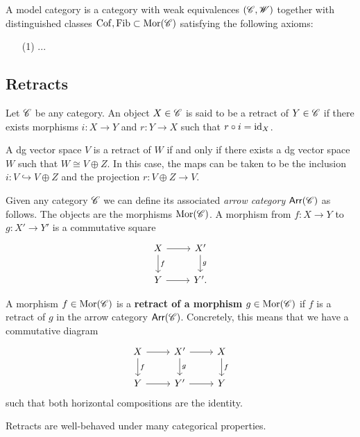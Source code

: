 \documentclass[11pt]{amsart}
\begin{document}
\begin{dfn}
A model category is a category with weak equivalences $(\mathscr C, \mathscr W)$ together with distinguished classes ${\rm Cof}, {\rm Fib} \subset {\rm Mor}(\mathscr C)$ satisfying the following axioms:
\begin{enumerate}
\item[(1)] ...
\end{enumerate}
\end{dfn}

\subsection{Retracts}

Let $\mathscr C$ be any category.
An object $X \in \mathscr C$ is said to be a retract of $Y \in \mathscr C$ if there exists morphisms $i : X \to Y$ and $r : Y \to X$ such that $r \circ i = {\rm id}_X$. 

\begin{eg}
A dg vector space $V$ is a retract of $W$ if and only if there exists a dg vector space $W$ such that $W \cong V \oplus Z$.
In this case, the maps can be taken to be the inclusion $i : V \hookrightarrow V \oplus Z$ and the projection $r : V \oplus Z \to V$. 
\end{eg}

\def\Arr{{\sf Arr}}

Given any category $\mathscr C$ we can define its associated {\em arrow category} $\Arr(\sC)$ as follows. 
The objects are the morphisms ${\rm Mor}(\mathscr C)$. 
A morphism from $f : X \to Y$ to $g : X' \to Y'$ is a commutative square
\[
\begin{tikzcd}
X \ar[r] \ar[d,"f"] & X' \ar[d, "g"] \\
Y \ar[r] & Y' .
\end{tikzcd}
\]

\begin{dfn}
A morphism $f \in {\rm Mor}(\mathscr C)$ is a {\bf retract of a morphism} $g \in {\rm Mor}(\mathscr C)$ if $f$ is a retract of $g$ in the arrow category $\Arr(\sC)$. 
Concretely, this means that we have a commutative diagram
\[
\begin{tikzcd}
X \ar[r] \ar[d,"f"] & X' \ar[d, "g"] \ar[r] & X\ar[d, "f"] \\
Y \ar[r] & Y' \ar[r] & Y 
\end{tikzcd}
\]
such that both horizontal compositions are the identity. 
\end{dfn}

Retracts are well-behaved under many categorical properties.
\end{document}
